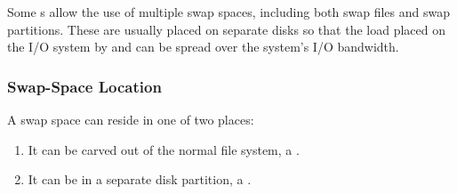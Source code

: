 Some s allow the use of multiple swap spaces, including both swap files and swap partitions.
These are usually placed on separate disks so that the load placed on the I/O system by  and  can be spread over the system’s I/O bandwidth.

\subsubsection{Swap-Space Location}\label{subsubsec:Swap_Space_Location}
A swap space can reside in one of two places:
\begin{enumerate}[noitemsep]
\item It can be carved out of the normal file system, a .
\item It can be in a separate disk partition, a .
\end{enumerate}


